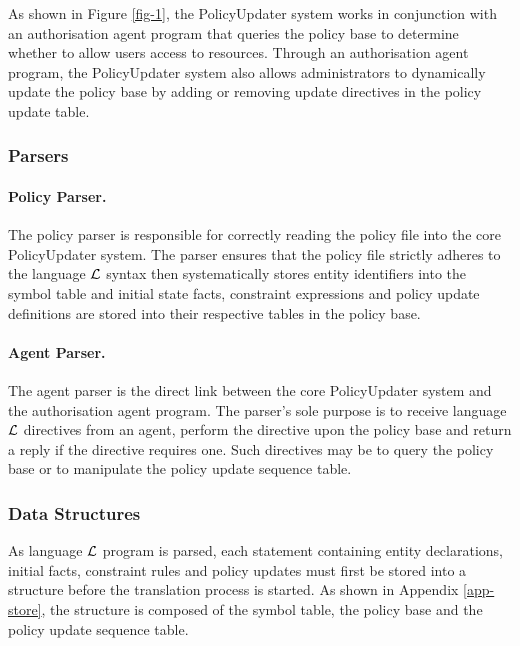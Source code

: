 \documentclass[global,twocolumn,draft]{svjour}
\begin{document}
      As shown in Figure \ref{fig-1}, the PolicyUpdater system works in
      conjunction with an authorisation agent program that queries the
      policy base to determine whether to allow users access to resources.
      Through an authorisation agent program, the PolicyUpdater system also
      allows administrators to dynamically update the policy base by adding
      or removing update directives in the policy update table.

      \subsubsection{Parsers}

        \paragraph{Policy Parser.}

          The policy parser is responsible for correctly reading the policy
          file into the core PolicyUpdater system. The parser ensures that
          the policy file strictly adheres to the language $\cal{L}$ syntax
          then systematically stores entity identifiers into the symbol table
          and initial state facts, constraint expressions and policy update
          definitions are stored into their respective tables in the policy
          base.

        \paragraph{Agent Parser.}

          The agent parser is the direct link between the core PolicyUpdater
          system and the authorisation agent program. The parser's sole purpose
          is to receive language $\cal{L}$ directives from an agent, perform
          the directive upon the policy base and return a reply if the
          directive requires one. Such directives may be to query the policy
          base or to manipulate the policy update sequence table.

      \subsubsection{Data Structures}

        As language ${\cal L}$ program is parsed, each statement containing
        entity declarations, initial facts, constraint rules and policy
        updates must first be stored into a structure before the translation
        process is started. As shown in Appendix \ref{app-store}, the structure
        is composed of the symbol table, the policy base and the policy update
        sequence table.
\end{document}
